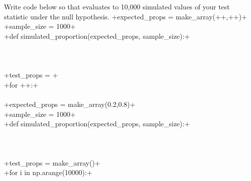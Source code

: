 \begin{enumerate}
     Write code below so that  evaluates to 10,000 simulated values of your test statistic under the null hypothesis.
    \vskip 0.1in
    \solutionimage
    {
    {\lsi+expected_props = make_array(+\bk+,+\bk+)+}\\[4pt]
    {\lsi+sample_size = 1000+}\\[8pt]
    {\lsi+def simulated_proportion(expected_props, sample_size):+}\\[10pt]
    \hspace*{0.5in}{\lsi+null_props = +\bk+(+\bk+,+\bkmed+)+}\\[10pt]
    \hspace*{0.5in}{\lsi+prop_sick = null_props.+\bk+(+\bk+)+}\\[10pt]
    \hspace*{0.5in}{\lsi+return +\bkmed++}\\[18pt]
    {\lsi+test_props = +\bklong}\\[15pt]
    {\lsi+for  +\bkmed+:+}\\[10pt]
    \hspace*{0.5in}{\lsi+one_statistic = +\bklong}\\[10pt]
    \hspace*{0.5in}{\lsi++\bk+ = +\bk+(+\bk+, one_statistic)+}
    }
    {
    {\lsi+expected_props = make_array(0.2,0.8)+}\\[4pt]
    {\lsi+sample_size = 1000+}\\[8pt]
    {\lsi+def simulated_proportion(expected_props, sample_size):+}\\[10pt]
    \hspace*{0.5in}{\lsi+null_props = sample_proportions(sample_size,expected_props)+}\\[10pt]
    \hspace*{0.5in}{\lsi+prop_sick = null_props.item(0)+}\\[10pt]
    \hspace*{0.5in}{\lsi+return prop_sick+}\\[18pt]
    {\lsi+test_props = make_array()+}\\[15pt]
    {\lsi+for  i in np.arange(10000):+}\\[10pt]
    \hspace*{0.5in}{\lsi+one_statistic = simulated_proportions(expected_props, sample_size)+}\\[10pt]
    \hspace*{0.5in}{\lsi+test_props = np.append(test_props, one_statistic)+}
    }
    




\end{enumerate}
